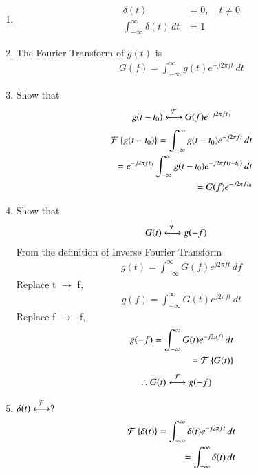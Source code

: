 \documentclass[journal,12pt,twocolumn]{IEEEtran}
\renewcommand\thesection{\arabic{section}}
\begin{document}
\begin{enumerate}[label=\thesection.\arabic*
,ref=\thesection.\theenumi]
\item 
	\begin{align}
		\delta(t)&=0, \quad t\neq0
\\
		\int_{-\infty}^{\infty}\delta(t) \, dt&= 1
	\end{align}
 \item The Fourier Transform of $g(t)$ is
 \begin{align}
 G(f)=\int_{-\infty}^{\infty}g(t)e^{-j2\pi ft}\,dt
 \end{align}
 \item Show that 
 \begin{align}
	 g(t-t_0)&\overset{\mathcal{F}}{ \longleftrightarrow}G(f)e^{-j2\pi ft_0}\\
 \end{align}
 \solution 
 \begin{align}
 \mathcal{F}\left\{g(t-t_0)\right\}=\int_{-\infty}^{\infty}g(t-t_0)e^{-j2\pi ft}\,dt\\
 =e^{-j2\pi ft_0}\int_{-\infty}^{\infty}g(t-t_0)e^{-j2\pi f\left(t-t_0\right)}\,dt\\
=G(f)e^{-j2\pi ft_0}
 \end{align}
 \item Show that 
 \begin{align}
  \label{eq:duality}
	 G(t)&\overset{\mathcal{F}}{ \longleftrightarrow}g(-f)
 \end{align}
 \solution From the definition of Inverse Fourier Transform
 \begin{align}
 g(t)=\int_{-\infty}^{\infty}G(f)e^{j2\pi ft}\,df
 \end{align}
 Replace t $\to$ f,
 \begin{align}
  g(f)=\int_{-\infty}^{\infty}G(t)e^{j2\pi ft}\,dt
  \end{align}
  Replace f $\to$ -f,
  \begin{align}
   g(-f)=\int_{-\infty}^{\infty}G(t)e^{-j2\pi ft}\,dt\\
    =\mathcal{F}\left\{G(t)\right\}
  \end{align}
  \begin{align}
  \therefore  G(t)&\overset{\mathcal{F}}{ \longleftrightarrow}g(-f)
  \label{eq:dual}
 \end{align}
 \item $\delta(t)\overset{\mathcal{F}}{ \longleftrightarrow}?$\\
 \solution
 \begin{align}
 \foutranin{\delta(t)}=\foutranfin{\delta(t)}\\
 =\int_{-\infty}^{\infty}\delta(t)\,dt\\

\end{align}
\end{enumerate}
\end{document}
